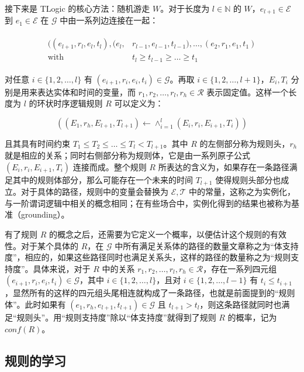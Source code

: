 \documentclass[a4paper, AutoFakeBold]{article}
\begin{document}
接下来是 TLogic 的核心方法：随机游走 $W$。对于长度为 $l\in{\mathbb N}$ 的 $W$，$e_{l+1}\in{\mathcal E}$ 到 $e_1\in{\mathcal E}$ 在 ${\mathcal G}$ 中由一系列边连接在一起：

\begin{equation}
	\begin{aligned}
		\begin{split}
			((e_{l+1},r_l,e_l,t_l),(e_l, & r_{l-1}, e_{l-1}, t_{l-1}),\dots,(e_2, r_1, e_1, t_1)\\ 
			\text{with}\ & t_l\ge t_{l-1}\ge \dots\ge t_1
		\end{split}
	\end{aligned}
\end{equation}

对任意 $i\in\{1,2,\dots,l\}$ 有 $(e_{i+1},r_i,e_i,t_i)\in{\mathcal G}$。再取 $i\in\{1,2,\dots,l+1\}$，$E_i, T_i$ 分别是用来表达实体和时间的变量，而 $r_1, r_2,\dots,r_l,r_h\in{\mathcal R}$ 表示固定值。这样一个长度为 $l$ 的环状时序逻辑规则 $R$ 可以定义为：

\begin{equation}
	((E_1, r_h, E_{l+1}, T_{l+1})\leftarrow\wedge_{i=1}^l(E_i, r_i, E_{i+1}, T_i))
\end{equation}

且其具有时间约束 $T_1\le T_2\le\dots\le T_l< T_{l+1}$。其中 $R$ 的左侧部分称为规则头，$r_h$ 就是相应的关系；同时右侧部分称为规则体，它是由一系列原子公式 $(E_i,r_i,E_{i+1},T_i)$ 连接而成。整个规则 $R$ 所表达的含义为，如果存在一条路径满足其中的规则体部分，那么可能存在一个未来的时间 $T_{l+1}$ 使得规则头部分也成立。对于具体的路径，规则中的变量会替换为 ${\mathcal E},{\mathcal T}$ 中的常量，这称之为实例化，与一阶谓词逻辑中相关的概念相同；在有些场合中，实例化得到的结果也被称为基准（grounding）。

有了规则 $R$ 的概念之后，还需要为它定义一个概率，以便估计这个规则的有效性。对于某个具体的 $R$，在 ${\mathcal G}$ 中所有满足关系体的路径的数量文章称之为“体支持度”，相应的，如果这些路径同时也满足关系头，这样的路径的数量称之为“规则支持度”。具体来说，对于 $R$ 中的关系 $r_1, r_2,\dots,r_l,r_h\in{\mathcal R}$，存在一系列四元组 $(e_{i+1},r_i,e_i,t_i)\in{\mathcal G}$，其中 $i\in\{1,2,\dots,l\}$，且对 $i\in\{1,2,\dots,l-1\}$ 有 $t_i\le t_{i+1}$，显然所有的这样的四元组头尾相连就构成了一条路径，也就是前面提到的“规则体”。此时如果有 $(e_1,r_h,e_{l+1},t_{l+1})\in{\mathcal G}$ 且 $t_{l+1}>t_l$，则这条路径就同时也满足“规则头”。用“规则支持度”除以“体支持度”就得到了规则 $R$ 的概率，记为 $conf(R)$。

\subsection{规则的学习}
\end{document}

